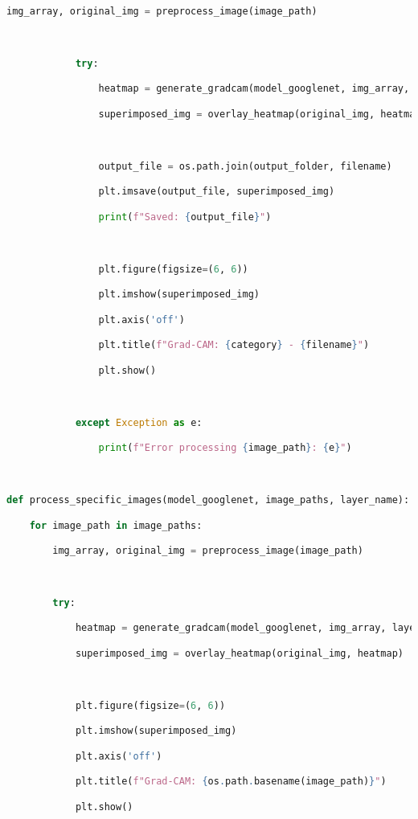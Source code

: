 \documentclass{article}
\begin{document}
\begin{lstlisting}[style=mystyle,language=Python]
            img_array, original_img = preprocess_image(image_path)



            try:

                heatmap = generate_gradcam(model_googlenet, img_array, layer_name)

                superimposed_img = overlay_heatmap(original_img, heatmap)



                output_file = os.path.join(output_folder, filename)

                plt.imsave(output_file, superimposed_img)

                print(f"Saved: {output_file}")



                plt.figure(figsize=(6, 6))

                plt.imshow(superimposed_img)

                plt.axis('off')

                plt.title(f"Grad-CAM: {category} - {filename}")

                plt.show()



            except Exception as e:

                print(f"Error processing {image_path}: {e}")



def process_specific_images(model_googlenet, image_paths, layer_name):

    for image_path in image_paths:

        img_array, original_img = preprocess_image(image_path)



        try:

            heatmap = generate_gradcam(model_googlenet, img_array, layer_name)

            superimposed_img = overlay_heatmap(original_img, heatmap)



            plt.figure(figsize=(6, 6))

            plt.imshow(superimposed_img)

            plt.axis('off')

            plt.title(f"Grad-CAM: {os.path.basename(image_path)}")

            plt.show()




\end{lstlisting}
\end{document}
